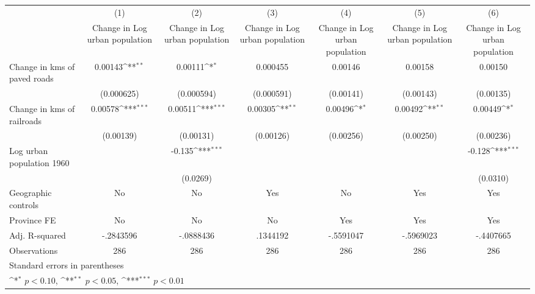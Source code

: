 {
\def\sym#1{\ifmmode^{#1}\else\(^{#1}\)\fi}
\begin{tabular}{l*{6}{c}}
\hline\hline
                    &\multicolumn{1}{c}{(1)}&\multicolumn{1}{c}{(2)}&\multicolumn{1}{c}{(3)}&\multicolumn{1}{c}{(4)}&\multicolumn{1}{c}{(5)}&\multicolumn{1}{c}{(6)}\\
                    &\multicolumn{1}{c}{Change in Log urban population}&\multicolumn{1}{c}{Change in Log urban population}&\multicolumn{1}{c}{Change in Log urban population}&\multicolumn{1}{c}{Change in Log urban population}&\multicolumn{1}{c}{Change in Log urban population}&\multicolumn{1}{c}{Change in Log urban population}\\
\hline
Change in kms of paved roads&     0.00143\sym{**} &     0.00111\sym{*}  &    0.000455         &     0.00146         &     0.00158         &     0.00150         \\
                    &  (0.000625)         &  (0.000594)         &  (0.000591)         &   (0.00141)         &   (0.00143)         &   (0.00135)         \\
[1em]
Change in kms of railroads&     0.00578\sym{***}&     0.00511\sym{***}&     0.00305\sym{**} &     0.00496\sym{*}  &     0.00492\sym{**} &     0.00449\sym{*}  \\
                    &   (0.00139)         &   (0.00131)         &   (0.00126)         &   (0.00256)         &   (0.00250)         &   (0.00236)         \\
[1em]
Log urban population 1960&                     &      -0.135\sym{***}&                     &                     &                     &      -0.128\sym{***}\\
                    &                     &    (0.0269)         &                     &                     &                     &    (0.0310)         \\
\hline
Geographic controls &          No         &          No         &         Yes         &          No         &         Yes         &         Yes         \\
Province FE         &          No         &          No         &          No         &         Yes         &         Yes         &         Yes         \\
Adj. R-squared      &   -.2843596         &   -.0888436         &    .1344192         &   -.5591047         &   -.5969023         &   -.4407665         \\
Observations        &         286         &         286         &         286         &         286         &         286         &         286         \\
\hline\hline
\multicolumn{7}{l}{\footnotesize Standard errors in parentheses}\\
\multicolumn{7}{l}{\footnotesize \sym{*} \(p<0.10\), \sym{**} \(p<0.05\), \sym{***} \(p<0.01\)}\\
\end{tabular}
}
